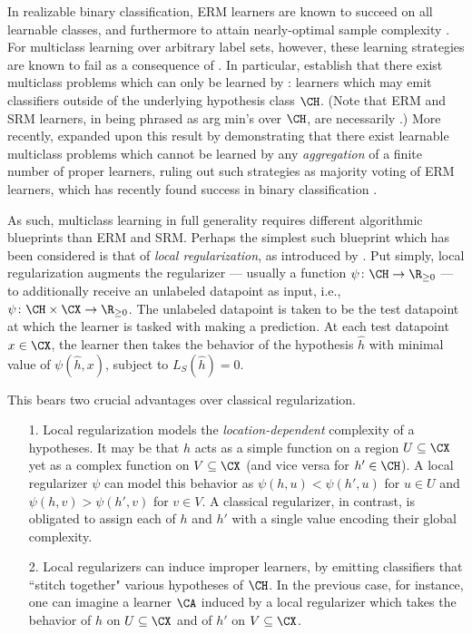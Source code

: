 In realizable binary classification, ERM learners are known to succeed on all learnable classes, and furthermore to attain nearly-optimal sample complexity \citep{vapnik1974theory,BEHW89,ehrenfeucht1989general}. For multiclass learning over arbitrary label sets, however, these learning strategies are known to fail as a consequence of \citet[Theorem~1]{DS14}. In particular, \citet{DS14} establish that there exist multiclass problems which can only be learned by : learners which may emit classifiers outside of the underlying hypothesis class $\CH$. (Note that ERM and SRM learners, in being phrased as arg min's over $\CH$, are necessarily .) More recently, \citet{asilisunderstanding} expanded upon this result by demonstrating that there exist learnable multiclass problems which cannot be learned by any \emph{aggregation} of a finite number of proper learners, ruling out such strategies as majority voting of ERM learners, which has recently found success in binary classification \citep{aden2024majority,hogsgaardmany}. 

As such, multiclass learning in full generality requires different algorithmic blueprints than ERM and SRM. Perhaps the simplest such blueprint which has been considered is that of \emph{local regularization}, as introduced by \citet{asilis2024regularization}. Put simply, local regularization augments the regularizer --- usually a function $\psi \colon \CH \to \R_{\geq 0}$ --- to additionally receive an unlabeled datapoint as input, i.e., $\psi \colon \CH \times \CX \to \R_{\geq 0}$. The unlabeled datapoint is taken to be the test datapoint at which the learner is tasked with making a prediction. At each test datapoint $x \in \CX$, the learner then takes the behavior of the hypothesis $\widehat{h}$ with minimal value of $\psi(\widehat{h}, x)$, subject to $L_S(\widehat{h}) = 0$. 

This bears two crucial advantages over classical regularization.
\begin{itemize}
    \item[1.] Local regularization models the \emph{location-dependent} complexity of a hypotheses. It may be that $h$ acts as a simple function on a region $U \subseteq \CX$ yet as a complex function on $V \subseteq \CX$ (and vice versa for $h' \in \CH$). A local regularizer $\psi$ can model this behavior as $\psi(h, u) < \psi(h', u)$ for $u \in U$ and $\psi(h, v) > \psi(h', v)$ for $v \in V$. A classical regularizer, in contrast, is obligated to assign each of $h$ and $h'$ with a single value encoding their global complexity. 

    \item[2.] Local regularizers can induce improper learners, by emitting classifiers that ``stitch together" various hypotheses of $\CH$. In the previous case, for instance, one can imagine a learner $\CA$ induced by a local regularizer which takes the behavior of $h$ on $U \subseteq \CX$ and of $h'$ on $V \subseteq \CX$. 
\end{itemize}

